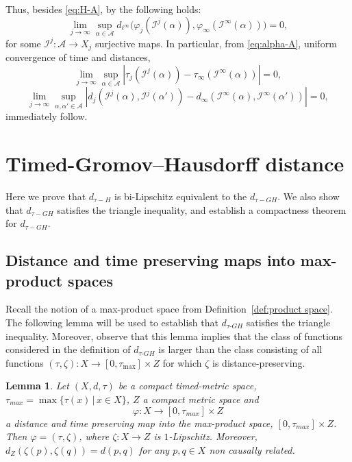 \documentclass[a4paper,12pt,reqno]{amsart}
\theoremstyle{plain}
\newtheorem{lem}[thm]{Lemma}
\newcommand{\be}{\begin{equation}}
\newcommand{\ee}{\end{equation}}
\begin{document}
Thus, besides \eqref{eq:H-A}, by \cite[Proposition~3.4]{Che-Perales-Sormani-2025} the following holds: 
\be \label{eq:alpha-A}
\lim_{j \to \infty}\sup_{\alpha \in {\mathcal A}}
d_{\ell^\infty}
\Big(\varphi_j({\mathcal I}^j(\alpha)),
\varphi_\infty({\mathcal I}^\infty(\alpha)) \Big) = 0,
\ee
for some ${\mathcal I}^j\colon{\mathcal A}\to X_j$ surjective maps.  
In particular, from  \eqref{eq:alpha-A}, uniform convergence of time and distances,
\be \label{eq:sup-A}
\lim_{j \to \infty}\sup_{\alpha \in {\mathcal A}}
|\tau_j({\mathcal I}^j(\alpha))-
\tau_\infty({\mathcal I}^\infty(\alpha))|= 0,
\ee
\be \label{eq:sup-A-d}
\lim_{j \to \infty}\sup_{\alpha,\alpha' \in {\mathcal A}}
|d_j({\mathcal I}^j(\alpha),{\mathcal I}^j(\alpha'))-
d_\infty({\mathcal I}^\infty(\alpha),{\mathcal I}^\infty(\alpha'))|= 0,
\ee
immediately follow. 







\section{Timed-Gromov--Hausdorff distance}\label{sec-timedGH}
Here we prove 
 that  $d_{\tau-H}$
is bi-Lipschitz equivalent to the
$d_{\tau-GH}$.
 We also show that $d_{\tau-GH}$ satisfies the triangle inequality, and establish a compactness theorem for 
 $d_{\tau-GH}$.
 
 
\subsection{Distance and time preserving maps into max-product spaces}


Recall the notion of a max-product space from Definition~\ref{def:product space}. The following lemma will be used to establish that $d_{\tau\text{-}GH}$ satisfies the triangle inequality. Moreover, observe that this lemma implies that the class of functions considered in the definition of $d_{\tau\text{-}GH}$ is larger than the class consisting of all functions $(\tau,\zeta): X \to [0,\tau_{\max}] \times Z$ for which $\zeta$ is distance-preserving.



\begin{lem}\label{lem:zeta-dist-pres}
Let $(X,d,\tau)$ be a compact timed-metric space, 
$\tau_{max}= \max \{\tau(x) \, | \, x \in X\}$,
$Z$ a compact metric space
and
\be
\varphi:X\to [0,\tau_{max}]\times Z
\ee
a distance and time preserving map into the
max-product space, $[0,\tau_{max}]\times Z$.
Then $\varphi =(\tau, \zeta)$, where 
$\zeta:X\to Z$ is $1$-Lipschitz. Moreover, $d_Z(\zeta(p), \zeta(q))=d(p,q)$ for any $p,q \in X$ non causally related.
\end{lem}
\end{document}
